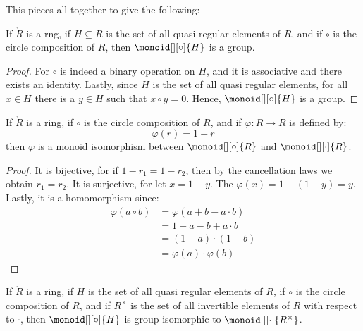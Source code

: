 \documentclass{book}                                                           %
\begin{document}
            This pieces all together to give the following:
            \begin{theorem}
                If $\ring{R}$ is a rng, if $H\subseteq{R}$ is the set of all
                quasi regular elements of $R$, and if $\circ$ is the
                circle composition of $R$, then $\monoid[][\circ]{H}$ is a
                group.
            \end{theorem}
            \begin{proof}
                For $\circ$ is indeed a binary operation on $H$, and it is
                associative and there exists an identity. Lastly, since $H$
                is the set of all quasi regular elements, for all $x\in{H}$
                there is a $y\in{H}$ such that $x\circ{y}=0$. Hence,
                $\monoid[][\circ]{H}$ is a group.
            \end{proof}
            \begin{theorem}
                If $\ring{R}$ is a ring, if $\circ$ is the circle
                composition of $R$, and if $\varphi:R\rightarrow{R}$ is
                defined by:
                \begin{equation}
                    \varphi(r)=1-r
                \end{equation}
                then $\varphi$ is a monoid isomorphism between
                $\monoid[][\circ]{R}$ and $\monoid[][\cdot]{R}$.
            \end{theorem}
            \begin{proof}
                It is bijective, for if $1-r_{1}=1-r_{2}$, then by the
                cancellation laws we obtain $r_{1}=r_{2}$. It is surjective,
                for let $x=1-y$. The $\varphi(x)=1-(1-y)=y$. Lastly, it is
                a homomorphism since:
                \begin{subequations}
                    \begin{align}
                        \varphi(a\circ{b})
                            &=\varphi(a+b-a\cdot{b})\\
                            &=1-a-b+a\cdot{b}\\
                            &=(1-a)\cdot(1-b)\\
                            &=\varphi(a)\cdot\varphi(b)
                    \end{align}
                \end{subequations}
            \end{proof}
            \begin{theorem}
                If $\ring{R}$ is a ring, if $H$ is the set of all quasi
                regular elements of $R$, if $\circ$ is the circle
                composition of $R$, and if $R^{\times}$ is the set of all
                invertible elements of $R$ with respect to $\cdot$, then
                $\monoid[][\circ]{H}$ is group isomorphic to
                $\monoid[][\cdot]{R^{\times}}$.
            \end{theorem}
\end{document}
